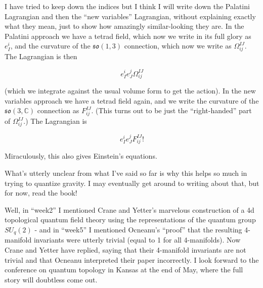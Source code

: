 \documentclass{article}
\def\tightlist{}
\renewcommand{\texttt}[1]{%
  \begingroup
  \ttfamily
  \begingroup\lccode`~=`/\lowercase{\endgroup\def~}{/\discretionary{}{}{}}%
  \begingroup\lccode`~=`[\lowercase{\endgroup\def~}{[\discretionary{}{}{}}%
  \begingroup\lccode`~=`.\lowercase{\endgroup\def~}{.\discretionary{}{}{}}%
  \catcode`/=\active\catcode`[=\active\catcode`.=\active
  \scantokens{#1\noexpand}%
  \endgroup
}
\begin{document}
I have tried to keep down the indices but I think I will write down the
Palatini Lagrangian and then the ``new variables'' Lagrangian, without
explaining exactly what they mean, just to show how amazingly
similar-looking they are. In the Palatini approach we have a tetrad
field, which now we write in its full glory as \(e_I^i\), and the
curvature of the \(\mathfrak{so}(1,3)\) connection, which now we write
as \(\Omega_{ij}^{IJ}\). The Lagrangian is then

\[e_I^i e_J^j \Omega_{ij}^{IJ}\]

(which we integrate against the usual volume form to get the action). In
the new variables approach we have a tetrad field again, and we write
the curvature of the \(\mathfrak{so}(3,\mathbb{C})\) connection as
\(F_{ij}^{IJ}\). (This turns out to be just the ``right-handed'' part of
\(\Omega_{ij}^{IJ}\).) The Lagrangian is

\[e_I^i e_J^j F_{ij}^{IJ} !\]

Miraculously, this also gives Einstein's equations.

What's utterly unclear from what I've said so far is why this helps so
much in trying to quantize gravity. I may eventually get around to
writing about that, but for now, read the book!


Well, in ``week2'' I mentioned Crane and Yetter's marvelous construction
of a 4d topological quantum field theory using the representations of
the quantum group \(SU_q(2)\) - and in ``week5'' I mentioned Ocneanu's
``proof'' that the resulting 4-manifold invariants were utterly trivial
(equal to 1 for all 4-manifolds). Now Crane and Yetter have replied,
saying that their 4-manifold invariants are not trivial and that Ocneanu
interpreted their paper incorrectly. I look forward to the conference on
quantum topology in Kansas at the end of May, where the full story will
doubtless come out.

\end{document}
